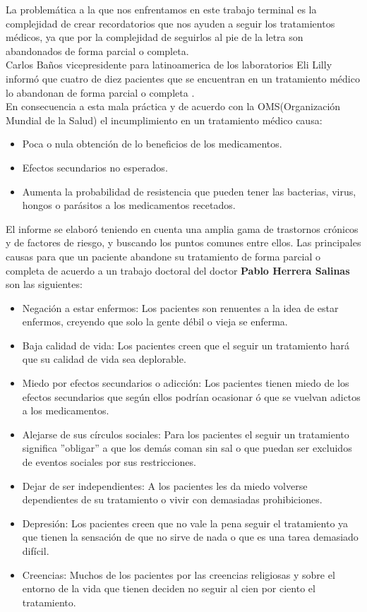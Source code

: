 La problemática a la que nos enfrentamos en este trabajo terminal es la complejidad de crear recordatorios que nos ayuden a seguir los tratamientos médicos, ya que por la complejidad de seguirlos al pie de la letra son abandonados de forma parcial o completa.\\
Carlos Baños vicepresidente para latinoamerica de los laboratorios Eli Lilly informó que cuatro de diez pacientes que se encuentran en un tratamiento médico lo abandonan de forma parcial o completa \cite{Referencia13}.\\
En consecuencia a esta mala práctica y de acuerdo con la OMS(Organización Mundial de la Salud)\cite{Referencia14} el incumplimiento en un tratamiento médico causa:
\begin{itemize}
	\item Poca o nula obtención de lo beneficios de los medicamentos.
	\item Efectos secundarios no esperados.
	\item Aumenta la probabilidad de resistencia que pueden tener las bacterias, virus, hongos o parásitos a los medicamentos recetados.
\end{itemize}
El informe se elaboró teniendo en cuenta una amplia gama de trastornos crónicos y de factores de riesgo, y buscando los puntos comunes entre ellos\cite{Referencia15}.
Las principales causas para que un paciente abandone su tratamiento de forma parcial o completa de acuerdo a un trabajo doctoral del doctor \textbf{Pablo Herrera Salinas}\cite{Referencia19} son las siguientes:
\begin{itemize}
	\item Negación a estar enfermos: Los pacientes son renuentes a la idea de estar enfermos, creyendo que solo la gente débil o vieja se enferma.
	\item Baja calidad de vida: Los pacientes creen que el seguir un tratamiento hará que su calidad de vida sea deplorable.
	\item Miedo por efectos secundarios o adicción: Los pacientes tienen miedo de los efectos secundarios que según ellos podrían ocasionar ó que se vuelvan adictos a los medicamentos.
	\item Alejarse de sus círculos sociales: Para los pacientes el seguir un tratamiento significa ''obligar'' a que los demás coman sin sal o que puedan ser excluidos de eventos sociales por sus restricciones.
	\item Dejar de ser independientes: A los pacientes les da miedo volverse dependientes de su tratamiento o vivir con demasiadas prohibiciones.
	\item Depresión: Los pacientes creen que no vale la pena seguir el tratamiento ya que tienen la sensación de que no sirve de nada o que es una tarea demasiado difícil.
	\item Creencias: Muchos de los pacientes por las creencias religiosas y sobre el entorno de la vida que tienen deciden no seguir al cien por ciento el tratamiento.
\end{itemize}

